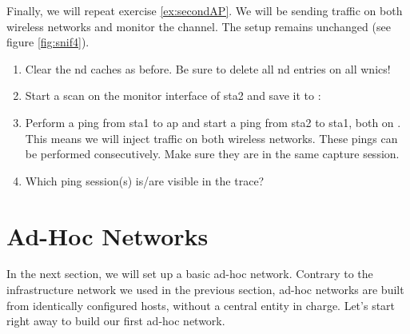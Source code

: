 \begin{exercise}

Finally, we will repeat exercise \ref{ex:secondAP}. We will be sending traffic on both wireless networks and monitor the channel. The setup remains unchanged (see figure \ref{fig:snif4}).

\begin{enumerate}
	\item Clear the \ac{nd} caches as before. Be sure to delete all \ac{nd} entries on all \acp{wnic}!
	\item Start a scan on the monitor interface of \ac{sta}2 and save it to : \newline
	\item Perform a ping from \ac{sta}1 to \ac{ap} and start a ping from \ac{sta}2 to \ac{sta}1, both on . This means we will inject traffic on both wireless networks.\newline
	\remark These pings can be performed consecutively. Make sure they are in the same capture session. \newline
	\item Which ping session(s) is/are visible in the trace?\newline
	\begin{esolution}
	\end{esolution}
\end{enumerate}




\end{exercise}





\section{Ad-Hoc Networks}

In the next section, we will set up a basic ad-hoc network. Contrary to the infrastructure network we used in the previous section, ad-hoc networks are built from identically configured hosts, without a central entity in charge. Let's start right away to build our first ad-hoc network.

